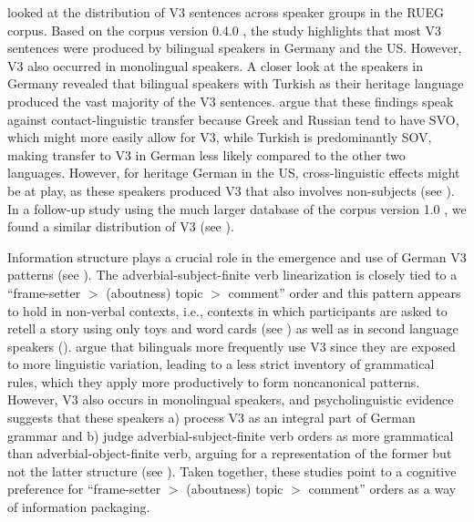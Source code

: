 \documentclass[output=paper,colorlinks,citecolor=brown]{langscibook}
\begin{document}
\citet{WieseEtAl2022} looked at the distribution of V3 sentences across speaker groups in the RUEG corpus. Based on the corpus version 0.4.0 \parencite{RUEG-Corpus-0.4.0}, the study highlights that most V3 sentences were produced by bilingual speakers in Germany and the US. However, V3 also occurred in monolingual speakers. A closer look at the speakers in Germany revealed that bilingual speakers with Turkish as their heritage language produced the vast majority of the V3 sentences. \citet{wiese_heritage_2022} argue that these findings speak against contact\hyp linguistic transfer because Greek and Russian tend to have SVO, which might more easily allow for V3, while Turkish is predominantly SOV, making transfer to V3 in German less likely compared to the other two languages. However, for heritage German in the US, cross-linguistic effects might be at play, as these speakers produced V3 that also involves non-subjects (see \cite{wiese_heritage_2022}). In a follow-up study using the much larger database of the corpus version 1.0 \parencite{RUEGcorpus2024}, we found a similar distribution of V3 (see \cite{bunk_status_nodate}).


Information structure plays a crucial role in the emergence and use of German V3 patterns (see \cite{WieseHeike2009Giim, schalowski_adverbial_2017, wiese_hidden_2018, bunk_aber_2020}). The adverbial-subject-finite verb linearization is closely tied to a “frame-setter $>$ (aboutness) topic $>$ comment” order and this pattern appears to hold in non-verbal contexts, i.e., contexts in which participants are asked to retell a story using only toys and word cards (see \cite{wiese_language_2020}) as well as in second language speakers (\cite{bunk_v2_nodate}). \citet{WieseHeike2016Cinu} argue that bilinguals more frequently use V3 since they are exposed to more linguistic variation, leading to a less strict inventory of grammatical rules, which they apply more productively to form noncanonical patterns. However, V3 also occurs in monolingual speakers, and psycholinguistic evidence suggests that these speakers a) process V3 as an integral part of German grammar and b) judge adverbial-subject-finite verb orders as more grammatical than adverbial-object-finite verb, arguing for a representation of the former but not the latter structure (see \cite{bunk_aber_2020}). Taken together, these studies point to a cognitive preference for “frame-setter $>$ (aboutness) topic $>$ comment” orders as a way of information packaging. 
\end{document}
